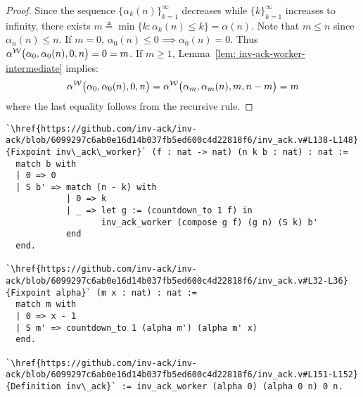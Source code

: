 \begin{proof} %
	Since the sequence $\big\{\alpha_k(n)\big\}_{k=1}^{\infty}$ decreases while $\{k\}_{k=1}^{\infty}$ increases to infinity, there exists $m \triangleq \min\big\{k : \alpha_k(n) \le k \} = \alpha(n)$. Note that $m\le n$ since $\alpha_n(n)\le n$.
	If $m = 0$, $\alpha_0(n)\le 0 \!\! \implies \!\! \alpha_0(n) = 0$. Thus $\alpha^{\mathcal{W}}\big(\alpha_0, \alpha_0(n), 0, n\big) = 0 = m$. If $m \ge 1$, Lemma~\ref{lem: inv-ack-worker-intermediate} implies:
	$$ \alpha^{\mathcal{W}}\big(\alpha_0, \alpha_0(n), 0, n\big) = \alpha^{\mathcal{W}}\big(\alpha_m, \alpha_m(n), m, n - m\big) = m $$
	where the last equality follows from the recursive rule.
\end{proof}
\begin{lstlisting}
`\href{https://github.com/inv-ack/inv-ack/blob/6099297c6ab0e16d14b037fb5ed600c4d22818f6/inv_ack.v#L138-L148} {Fixpoint inv\_ack\_worker}` (f : nat -> nat) (n k b : nat) : nat :=
  match b with
  | 0 => 0
  | S b' => match (n - k) with
            | 0 => k
            | _ => let g := (countdown_to 1 f) in 
                   inv_ack_worker (compose g f) (g n) (S k) b'
            end
  end.

`\href{https://github.com/inv-ack/inv-ack/blob/6099297c6ab0e16d14b037fb5ed600c4d22818f6/inv_ack.v#L32-L36}{Fixpoint alpha}` (m x : nat) : nat :=
  match m with
  | 0 => x - 1
  | S m' => countdown_to 1 (alpha m') (alpha m' x)
  end.
  
`\href{https://github.com/inv-ack/inv-ack/blob/6099297c6ab0e16d14b037fb5ed600c4d22818f6/inv_ack.v#L151-L152}{Definition inv\_ack}` := inv_ack_worker (alpha 0) (alpha 0 n) 0 n.
\end{lstlisting}

